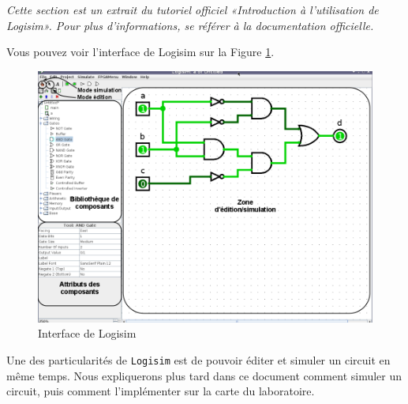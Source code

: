 \documentclass{article}
\begin{document}
    \textit{Cette section est un extrait du tutoriel officiel «Introduction à l’utilisation de Logisim». Pour plus d'informations, se référer à la documentation officielle.}

    Vous pouvez voir l'interface de Logisim sur la Figure  \ref{fig_logisim_description}.

    \begin{figure}[t]
        \begin{center}
            \includegraphics[width=500pt]{pictures/Logisim_description.png}
            \caption{\label{fig_logisim_description}Interface de Logisim}
        \end{center}
    \end{figure}

    Une des particularités de \texttt{Logisim} est de pouvoir éditer et simuler un circuit en même temps.
    Nous expliquerons plus tard dans ce document comment simuler un circuit, puis comment l'implémenter sur la carte du
    laboratoire.


\end{document}
